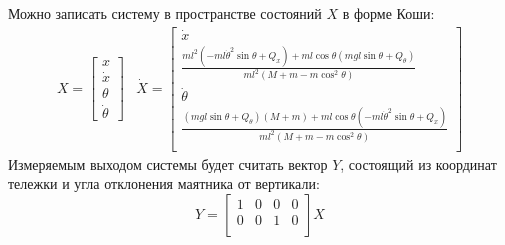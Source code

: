 Можно записать систему в пространстве состояний $X$ в форме Коши: 
\begin{equation}
    \begin{array}{cc}
        X = \begin{bmatrix} 
            x \\
            \dot{x} \\
            \theta \\
            \dot{\theta}
    \end{bmatrix} & 
    \dot{X} = \begin{bmatrix}
        \dot{x} \\
        \frac{ml^2(-ml\dot{\theta}^2\sin\theta + Q_x) + ml\cos\theta(mgl\sin\theta + Q_{\theta})}{ml^2(M + m - m\cos^2\theta)} \\ 
        \dot{\theta} \\
        \frac{(mgl\sin\theta + Q_{\theta})(M + m) + ml\cos\theta(-ml\dot{\theta}^2\sin\theta + Q_x) }{ml^2(M + m - m\cos^2\theta)} \\ 
    \end{bmatrix}
    \end{array}
\end{equation}
Измеряемым выходом системы будет считать вектор $Y$, состоящий из координат тележки и угла отклонения маятника от вертикали:
\begin{equation}
    Y = \begin{bmatrix}
        1 & 0 & 0 & 0 \\
        0 & 0 & 1 & 0 \\ 
    \end{bmatrix} X
\end{equation}

